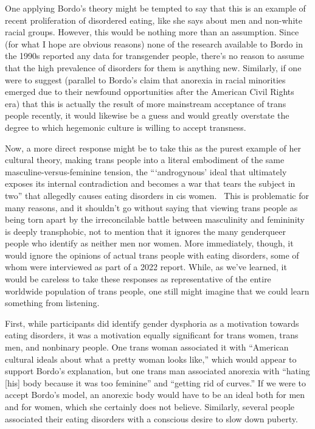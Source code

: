 \documentclass[11pt]{article}
\begin{document}
    One applying Bordo's theory might be tempted to say that this is an example of recent proliferation of disordered eating, like she says about men and non-white racial groups. However, this would be nothing more than an assumption. Since (for what I hope are obvious reasons) none of the research available to Bordo in the 1990s reported any data for transgender people, there's no reason to assume that the high prevalence of disorders for them is anything new. Similarly, if one were to suggest (parallel to Bordo's claim that anorexia in racial minorities emerged due to their newfound opportunities after the American Civil Rights era) that this is actually the result of more mainstream acceptance of trans people recently, it would likewise be a guess and would greatly overstate the degree to which hegemonic culture is willing to accept transness. 

    Now, a more direct response might be to take this as the purest example of her cultural theory, making trans people into a literal embodiment of the same masculine-versus-feminine tension, the ```androgynous' ideal that ultimately exposes its internal contradiction and becomes a war that tears the subject in two'' that allegedly causes eating disorders in cis women.~\autocite[174]{Bordo03} This is problematic for many reasons, and it shouldn't go without saying that viewing trans people as being torn apart by the irreconcilable battle between masculinity and femininity is deeply transphobic, not to mention that it ignores the many genderqueer people who identify as neither men nor women. More immediately, though, it would ignore the opinions of actual trans people with eating disorders, some of whom were interviewed as part of a 2022 report. While, as we've learned, it would be careless to take these responses as representative of the entire worldwide population of trans people, one still might imagine that we could learn something from listening. 

    First, while participants did identify gender dysphoria as a motivation towards eating disorders, it was a motivation equally significant for trans women, trans men, and nonbinary people. One trans woman associated it with ``American cultural ideals about what a pretty woman looks like,'' which would appear to support Bordo's explanation, but one trans man associated anorexia with ``hating [his] body because it was too feminine'' and ``getting rid of curves.'' If we were to accept Bordo's model, an anorexic body would have to be an ideal both for men and for women, which she certainly does not believe. Similarly, several people associated their eating disorders with a conscious desire to slow down puberty.~\autocite[426]{Cusak22}
    
\end{document}
